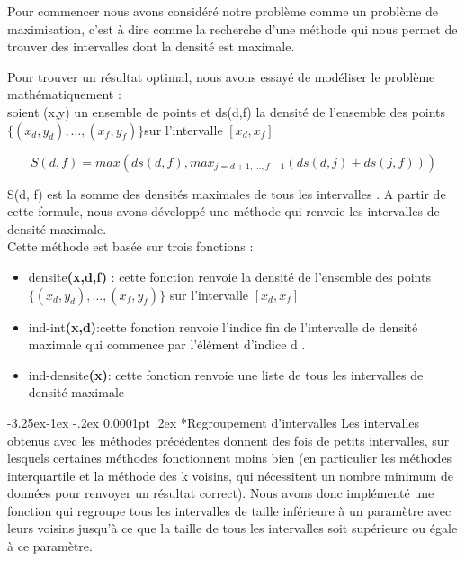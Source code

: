 \documentclass[a4paper,12pt]{article} %
\makeatletter
\renewcommand\subparagraph{\@startsection{subparagraph}{5}{\z@}%
                                      {-3.25ex\@plus -1ex \@minus -.2ex}%
                                      {0.0001pt \@plus .2ex}%
                                      {\normalfont\normalsize\bfseries}}
\makeatother
\begin{document}
                        Pour commencer nous avons considéré notre problème comme un problème de maximisation, c'est à dire comme la recherche d'une méthode qui nous permet de trouver des intervalles dont la densité est maximale.
                        
                        
                        Pour trouver un résultat optimal, nous avons essayé de modéliser le problème mathématiquement :\\
                        soient (x,y) un ensemble de points et ds(d,f) la densité de l'ensemble des points
                        $\{( x_d, y_d),…,( x_f, y_f ) \}$sur l'intervalle $[ x_d,x_f]$
                        	
                        \begin{flushleft}
                            \bf
                            
                        
                        $$S(d,f)= max (ds(d,f),max_{j=d+1,...,f-1}(ds(d,j)+ds(j,f)))$$
                         \end{flushleft}
                        S(d, f) est la somme des densités maximales de tous les intervalles .
                      A partir de cette formule, nous avons développé une méthode qui renvoie les intervalles de densité maximale.  \\
                        Cette méthode est basée sur trois fonctions :
                        \begin{itemize}
                        \item densite\textbf{(x,d,f)} : cette fonction renvoie la densité de l'ensemble des points $\{( x_d, y_d),…, ( x_f, y_f ) \}$ sur l’intervalle $[ x_d,x_f  ]$
                        \item ind-int\textbf{(x,d)}:cette fonction renvoie l'indice fin de l'intervalle de densité maximale qui commence par l'élément d'indice d . 
                        \item 	ind-densite\textbf{(x)}: cette fonction renvoie une liste de tous les intervalles de densité maximale
                        \end{itemize}
				
				    \subparagraph*{Regroupement d'intervalles}
				        Les intervalles obtenus avec les méthodes précédentes donnent des fois de petits intervalles, sur lesquels certaines méthodes fonctionnent moins bien (en particulier les méthodes interquartile et la méthode des k voisins, qui nécessitent un nombre minimum de données pour renvoyer un résultat correct). Nous avons donc implémenté une fonction qui regroupe tous les intervalles de taille inférieure à un paramètre avec leurs voisins jusqu'à ce que la taille de tous les intervalles soit supérieure ou égale à ce paramètre. 
				        
\end{document}
